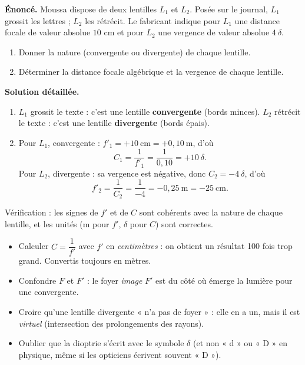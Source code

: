 \documentclass[11pt]{article}
\begin{document}
\begin{exoresolu}
\textbf{Énoncé.} Moussa dispose de deux lentilles $L_1$ et $L_2$. Posée sur le journal, $L_1$ grossit les lettres ; $L_2$ les rétrécit. Le fabricant indique pour $L_1$ une distance focale de valeur absolue $10$ cm et pour $L_2$ une vergence de valeur absolue $4\ \delta$.
\begin{enumerate}
\item Donner la nature (convergente ou divergente) de chaque lentille.
\item Déterminer la distance focale algébrique et la vergence de chaque lentille.
\end{enumerate}
\tcblower
\textbf{Solution détaillée.}
\begin{enumerate}
\item $L_1$ grossit le texte : c'est une lentille \textbf{convergente} (bords minces). $L_2$ rétrécit le texte : c'est une lentille \textbf{divergente} (bords épais).
\item Pour $L_1$, convergente : $f'_1 = +10\ \text{cm} = +0{,}10\ \text{m}$, d'où
\[ C_1 = \frac{1}{f'_1} = \frac{1}{0{,}10} = +10\ \delta. \]
Pour $L_2$, divergente : sa vergence est négative, donc $C_2 = -4\ \delta$, d'où
\[ f'_2 = \frac{1}{C_2} = \frac{1}{-4} = -0{,}25\ \text{m} = -25\ \text{cm}. \]
\end{enumerate}
Vérification : les signes de $f'$ et de $C$ sont cohérents avec la nature de chaque lentille, et les unités (m pour $f'$, $\delta$ pour $C$) sont correctes.
\end{exoresolu}

\begin{attention}
\begin{itemize}
\item Calculer $C = \dfrac{1}{f'}$ avec $f'$ en \emph{centimètres} : on obtient un résultat 100 fois trop grand. Convertis toujours en mètres.
\item Confondre $F$ et $F'$ : le foyer \emph{image} $F'$ est du côté où émerge la lumière pour une convergente.
\item Croire qu'une lentille divergente « n'a pas de foyer » : elle en a un, mais il est \emph{virtuel} (intersection des prolongements des rayons).
\item Oublier que la dioptrie s'écrit avec le symbole $\delta$ (et non « d » ou « D » en physique, même si les opticiens écrivent souvent « D »).
\end{itemize}
\end{attention}
\end{document}
